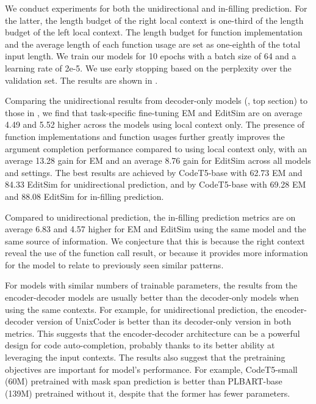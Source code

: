 We conduct experiments for both the unidirectional and in-filling prediction. 
For the latter, the length budget of the right local context is one-third of the length budget of the left local context. The length budget for function implementation and the average length of each function usage are set as one-eighth of the total input length. 
We train our models for 10 epochs with a batch size of 64 and a learning rate of 2e-5.
We use early stopping based on the perplexity over the validation set.
The results are shown in . 

Comparing the unidirectional results from decoder-only models (, top section) to those in , we find that task-specific fine-tuning EM and EditSim are on average 4.49 and 5.52 higher across the models using local context only. 
The presence of function implementations and function usages further greatly improves the argument completion performance compared to using local context only, with an average 13.28 gain for EM and an average 8.76 gain for EditSim across all models and settings. 
The best results are achieved by CodeT5-base with 62.73 EM and 84.33 EditSim for unidirectional prediction, and by CodeT5-base with 69.28 EM and 88.08 EditSim for in-filling prediction.

Compared to unidirectional prediction, the in-filling prediction metrics are on average 6.83 and 4.57 higher for EM and EditSim  using the same model and the same source of information. 
We conjecture that this is because the right context reveal the use of the function call result, or because it provides more information for the model to relate to previously seen similar patterns.

For models with similar numbers of trainable parameters, the results from the encoder-decoder models are usually better than the decoder-only models when using the same contexts. 
For example, for unidirectional prediction, the encoder-decoder version of UnixCoder is better than its decoder-only version in both metrics. 
This suggests that the encoder-decoder architecture can be a powerful design for code auto-completion, probably thanks to its better ability at leveraging the input contexts.
The results also suggest that the pretraining objectives are important for model's performance. For example, CodeT5-small (60M) pretrained with mask span prediction is better than PLBART-base (139M) pretrained without it, despite that the former has fewer parameters.


